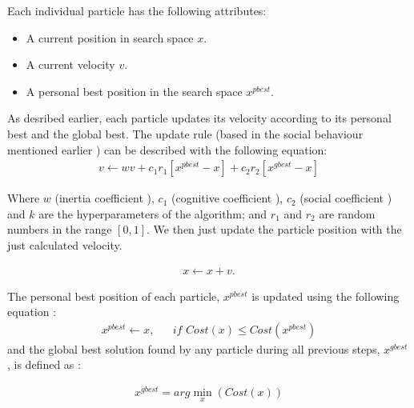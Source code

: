 \documentclass[journal]{IEEEtran}
\begin{document}
Each individual particle has the following attributes: 
\\
\begin{itemize}
    \item A current position in search space $x$.
    \item A current velocity $v$.
    \item A personal best position in the search space $x^{pbest}$.
\end{itemize}
As desribed earlier, each particle updates its velocity according to its personal best and the global best. The update rule (based in the social behaviour mentioned earlier ) can be described with the following equation:
\\
\begin{equation} \label{eq:1}
    \begin{aligned}
    v \leftarrow w v + c_{1} r_{1} [x^{pbest} - x] + c_{2} r_{2} [x^{gbest} - x]
    \end{aligned}
\end{equation}

Where $w$ (inertia coefficient ), $c_{1}$ (cognitive coefficient ), $c_{2}$ (social coefficient ) and $k$ are the hyperparameters of the algorithm; and $r_{1}$ and $r_{2}$ are random numbers in the range $[0, 1]$. We then just update the particle position with the just calculated velocity.

\begin{equation} \label{eq:2}
    \begin{aligned}
        x \leftarrow x + v.
    \end{aligned}
\end{equation}

The personal best position of each particle, $x^{pbest}$ is updated using the following equation :
\begin{equation} \label{eq:3}
  \begin{aligned}
    x^{pbest} \leftarrow x, &&\textit{if } Cost(x)\leq Cost(x^{pbest})
  \end{aligned}
\end{equation}
and the global best solution found by any particle during all previous steps, $x^{gbest}$, is defined as :

\begin{equation} \label{eq:4}
    \begin{aligned}
        x^{gbest}=arg\min_{x}( Cost(x) )
    \end{aligned}
\end{equation}
\end{document}
